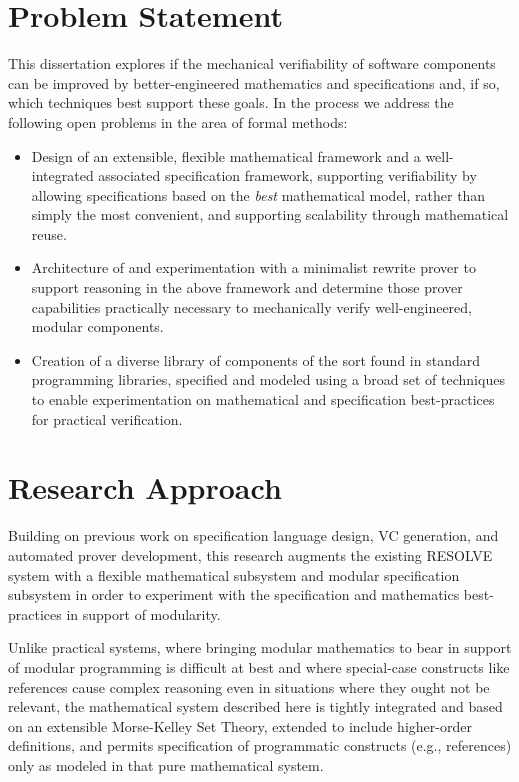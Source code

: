 \section{Problem Statement}
This dissertation explores if the mechanical verifiability of software components can be improved by better-engineered mathematics and specifications and, if so, which techniques best support these goals.  In the process we address the following open problems in the area of formal methods:

\begin{itemize}
\item Design of an extensible, flexible mathematical framework and a well-integrated associated specification framework, supporting verifiability by allowing specifications based on the \emph{best} mathematical model, rather than simply the most convenient, and supporting scalability through mathematical reuse.
\item Architecture of and experimentation with a minimalist rewrite prover to support reasoning in the above framework and determine those prover capabilities practically necessary to mechanically verify well-engineered, modular components.
\item Creation of a diverse library of components of the sort found in standard programming libraries, specified and modeled using a broad set of techniques to enable experimentation on mathematical and specification best-practices for practical verification.
\end{itemize}

\section{Research Approach}
Building on previous work on specification language design, VC generation, and automated prover development, this research augments the existing RESOLVE\cite{Sit11} system with a flexible mathematical subsystem and modular specification subsystem in order to experiment with the specification and mathematics best-practices in support of modularity.

Unlike practical systems, where bringing modular mathematics to bear in support of modular programming is difficult at best and where special-case constructs like references cause complex reasoning even in situations where they ought not be relevant, the mathematical system described here is tightly integrated and based on an extensible Morse-Kelley Set Theory, extended to include higher-order definitions, and permits specification of programmatic constructs (e.g., references) only as modeled in that pure mathematical system.

